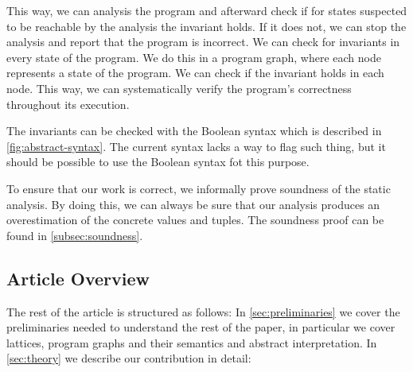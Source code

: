This way, we can analysis the program and afterward check if for states suspected to be reachable by the analysis the invariant holds.
If it does not, we can stop the analysis and report that the program is incorrect.
We can check for invariants in every state of the program.
We do this in a program graph, where each node represents a state of the program.
We can check if the invariant holds in each node.
This way, we can systematically verify the program's correctness throughout its execution.

The invariants can be checked with the Boolean syntax which is described in \autoref{fig:abstract-syntax}.
The current syntax lacks a way to flag such thing, but it should be possible to use the Boolean syntax fot this purpose.

To ensure that our work is correct, we informally prove soundness of the static analysis.
By doing this, we can always be sure that our analysis produces an overestimation of the concrete values and tuples.
The soundness proof can be found in \autoref{subsec:soundness}.

\subsection{Article Overview}\label{subsec:article-overview}
The rest of the article is structured as follows:
In \autoref{sec:preliminaries} we cover the preliminaries needed to understand the rest of the paper, in particular we cover lattices, program graphs and their semantics and abstract interpretation.
In \autoref{sec:theory} we describe our contribution in detail:

